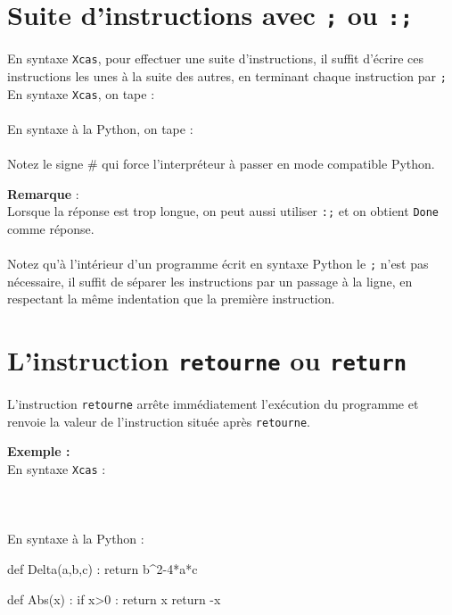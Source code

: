 \documentclass[12pt,a4paper]{book}
\begin{document}
\begin{giacjshere}
\section{Suite d'instructions avec {\tt ;} ou {\tt :;}}\index{;}\index{:;}
En syntaxe {\tt Xcas}, pour effectuer une suite d'instructions, il suffit 
d'\'ecrire ces instructions les unes \`a la suite des autres, en terminant 
chaque instruction par \verb|;|\\
En syntaxe {\tt Xcas}, on tape :\\
\\
En syntaxe \`a la Python, on tape  :\\
\\
Notez le signe \# qui
force l'interpr\'eteur \`a passer en mode compatible Python.

{\bf Remarque} :\\
Lorsque la r\'eponse est trop longue, on peut aussi utiliser {\tt :;} et 
on obtient {\tt Done} comme r\'eponse.\\ 
\\
Notez qu'\`a l'int\'erieur d'un programme \'ecrit en syntaxe Python
le \verb|;| n'est pas n\'ecessaire, il suffit de s\'eparer les
instructions par un passage \`a la ligne, en respectant la même indentation
que la premi\`ere instruction.

\section{L'instruction {\tt retourne} ou {\tt return}}
L'instruction {\tt retourne} arr\^ete imm\'ediatement 
l'ex\'ecution du programme et renvoie la
valeur de l'instruction situ\'ee apr\`es {\tt retourne}.

{\bf Exemple :}\\ 
En syntaxe {\tt Xcas} :\\
\\
\\
\\
En syntaxe \`a la Python :\\
\begin{giacprog}
def Delta(a,b,c) :
    return b^2-4*a*c
\end{giacprog}
\begin{giacprog}
def Abs(x) :
    if x>0 :
        return x
    return -x
\end{giacprog}
\\


\end{giacjshere}
\end{document}

